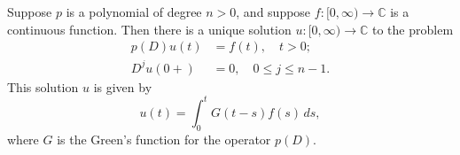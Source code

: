 Suppose $p$ is a polynomial of degree $n > 0$, and suppose $f: [0, \infty) \to \mathbb{C}$ is a continuous function. Then there is a unique solution $u: [0, \infty) \to \mathbb{C}$ to the problem
\begin{align}
p(D)u(t) &= f(t), \quad t > 0; \\
D^j u(0+) &= 0, \quad 0 \leq j \leq n-1.
\end{align}
This solution $u$ is given by
$$u(t) = \int_0^t G(t-s) f(s) \, ds,$$
where $G$ is the Green's function for the operator $p(D)$.
